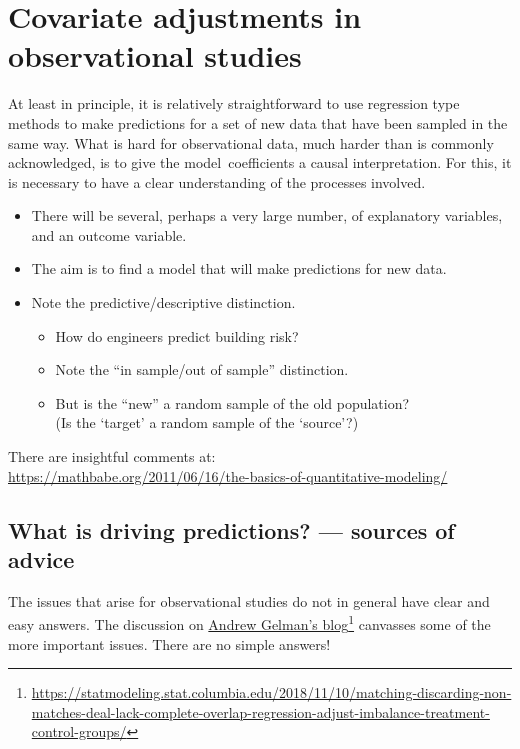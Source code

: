 \documentclass[
  10pt,
  b5paper]{book}
\providecommand{\tightlist}{%
  \setlength{\itemsep}{0pt}\setlength{\parskip}{0pt}}
\begin{document}
\hypertarget{covariate-adjustments-in-observational-studies}{%
\chapter{Covariate adjustments in observational studies}\label{covariate-adjustments-in-observational-studies}}

At least in principle, it is relatively straightforward to use
regression type methods to make predictions for a set of new
data that have been sampled in the same way. What is hard for
observational data, much harder than is commonly acknowledged,
is to give the model~coefficients a causal interpretation.
For this, it is necessary to have a clear understanding of the
processes involved.

\begin{itemize}
\tightlist
\item
  There will be several, perhaps a very large number,
  of explanatory variables, and an outcome variable.
\item
  The aim is to find a model that will make predictions for new data.
\item
  Note the predictive/descriptive distinction.

  \begin{itemize}
  \tightlist
  \item
    How do engineers predict building risk?
  \item
    Note the ``in sample/out of sample'' distinction.
  \item
    But is the ``new'' a random sample of the old population?\\
    (Is the `target' a random sample of the `source'?)
  \end{itemize}
\end{itemize}

There are insightful comments at:\\
\url{https://mathbabe.org/2011/06/16/the-basics-of-quantitative-modeling/}

\hypertarget{what-is-driving-predictions-sources-of-advice}{%
\section{What is driving predictions? --- sources of advice}\label{what-is-driving-predictions-sources-of-advice}}

The issues that arise for observational studies do not in general have
clear and easy answers. The discussion on
\href{https://statmodeling.stat.columbia.edu/2018/11/10/matching-discarding-non-matches-deal-lack-complete-overlap-regression-adjust-imbalance-treatment-control-groups/}{Andrew Gelman's blog}\footnote{\url{https://statmodeling.stat.columbia.edu/2018/11/10/matching-discarding-non-matches-deal-lack-complete-overlap-regression-adjust-imbalance-treatment-control-groups/}} canvasses
some of the more important issues. There are no simple answers!
\end{document}
